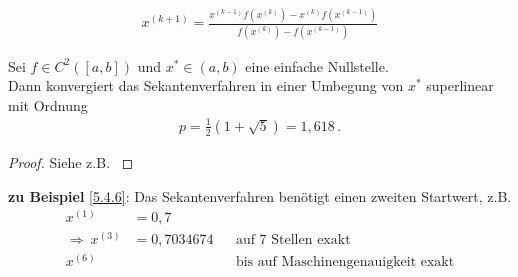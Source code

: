 \begin{gather}
x^{(k+1)} = \frac{x^{(k-1)}f(x^{(k)}) - x^{(k)}f(x^{(k-1)})}{f(x^{(k)})-f(x^{(k-1)})}
\label{V.4.2}
\end{gather}

\label{im5.4.7}


\begin{Satze}
	Sei $f\in C^2([a,b])$ und $x^{*}\in (a,b)$ eine einfache Nullstelle.\\
	Dann konvergiert das Sekantenverfahren in einer Umbegung von $x^{*}$
	superlinear mit Ordnung 
	\begin{gather*}
	p=\frac{1}{2}(1+\sqrt{5})= 1,618 \, .
	\end{gather*}
\end{Satze}

\begin{proof}
	Siehe z.B. \cite[][Zwischenwertsatz, Fibonacci-Folge]{haemmerlinhoffmann,stoerbulirsch}
\end{proof}

\textbf{zu Beispiel} \ref{5.4.6}: Das Sekantenverfahren benötigt
einen zweiten Startwert, z.B.
\begin{align*}
x^{(1)}&=0,7 \\
\Rightarrow ~ x^{(3)} &= 0,7034674 
&&\text{auf 7 Stellen exakt}\\
x^{(6)} &&& \text{bis auf Maschinengenauigkeit exakt}
\end{align*}


